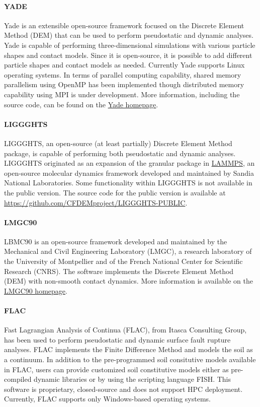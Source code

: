 \paragraph{YADE}
Yade is an extensible open-source framework focused on the Discrete Element Method (DEM) \citep{yade2005doc} that can be used to perform pseudostatic and dynamic analyses. Yade is capable of performing three-dimensional simulations with various particle shapes and contact models. Since it is open-source, it is possible to add different particle shapes and contact models as needed. Currently Yade supports Linux operating systems. In terms of parallel computing capability, shared memory parallelism using OpenMP has been implemented though distributed memory capability using MPI is under development. More information, including the source code, can be found on the \href{https://yade-dem.org/doc/}{Yade homepage}.

\paragraph{LIGGGHTS}
LIGGGHTS, an open-source (at least partially) Discrete Element Method package, is capable of performing both pseudostatic and dynamic analyses. LIGGGHTS originated as an expansion of the granular package in \href{https://lammps.sandia.gov/}{LAMMPS}, an open-source molecular dynamics framework developed and maintained by Sandia National Laboratories. Some functionality within LIGGGHTS is not available in the public version. The source code for the public version is available at \url{https://github.com/CFDEMproject/LIGGGHTS-PUBLIC}.

\paragraph{LMGC90}
 LBMC90 is an open-source framework developed and maintained by the Mechanical and Civil Engineering Laboratory (LMGC), a research laboratory of the University of Montpellier and of the French National Center for Scientific Research (CNRS). The software implements the Discrete Element Method (DEM) with non-smooth contact dynamics. More information is available on the \href{http://mimetics-engineering.fr/index.php/en/lmgc90-2/}{LMGC90 homepage}.

\paragraph{FLAC}
Fast Lagrangian Analysis of Continua (FLAC), from Itasca Consulting Group, has been used to perform pseudostatic and dynamic surface fault rupture analyses. FLAC implements the Finite Difference Method and models the soil as a continuum. In addition to the pre-programmed soil consitutive models available in FLAC, users can provide customized soil constitutive models either as pre-compiled dynamic libraries or by using the scripting language FISH. This software is proprietary, closed-source and does not support HPC deployment. Currently, FLAC supports only Windows-based operating systems.

